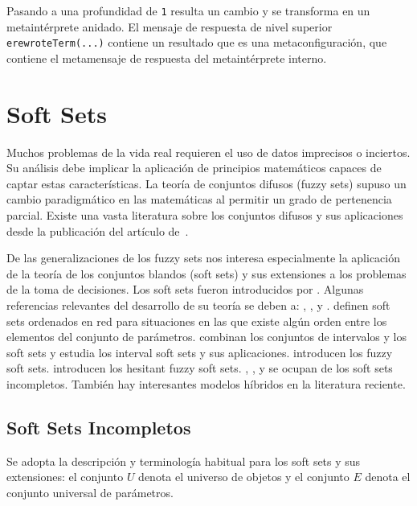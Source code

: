 Pasando a una profundidad de \texttt{1} resulta un cambio y se transforma en un metaintérprete anidado.
El mensaje de respuesta de nivel superior \texttt{erewroteTerm(...)} contiene un resultado que es una metaconfiguración, que contiene el metamensaje de respuesta del metaintérprete interno.



\newpage
\section{Soft Sets}\label{SS}
Muchos problemas de la vida real requieren el uso de datos imprecisos o inciertos. Su análisis debe implicar la aplicación de principios matemáticos capaces de captar estas características. La teoría de conjuntos difusos (fuzzy sets) supuso un cambio paradigmático en las matemáticas al permitir un grado de pertenencia parcial. Existe una vasta literatura sobre los conjuntos difusos y sus aplicaciones desde la publicación del artículo de~\citet{Zadeh}. 

De las generalizaciones de los fuzzy sets nos interesa especialmente la aplicación de la teoría de los conjuntos blandos (soft sets) y sus extensiones a los problemas de la toma de decisiones.
Los soft sets fueron introducidos por \citep{Molodtsov99}. 
Algunas referencias relevantes del desarrollo de su teoría se deben a: \citet{AktasCagman}, \citet{alcantud2016novel,Alcantud2016IJAR}, \citet{AliFengLiuMinShabir} y \citet{MajiBR03}.
\citet{AliMahmood} definen soft sets ordenados en red para situaciones en las que existe algún orden entre los elementos del conjunto de parámetros. \citet{QinMengPeiXu} combinan los conjuntos de intervalos y los soft sets y \citet{Zhang} estudia los interval soft sets y sus aplicaciones. \citet{MajiBR01} introducen los fuzzy soft sets. \citet{WangLiChen} introducen los hesitant fuzzy soft sets. \citet{Hanetal}, \citet{QinMaHerawanZain}, y \citet{ZouXiao} se ocupan de los soft sets incompletos. También hay interesantes modelos híbridos en la literatura reciente.


\subsection{Soft Sets Incompletos}

Se adopta la descripción y terminología habitual para los soft sets y sus extensiones: el conjunto $U$ denota el universo de objetos y el conjunto $E$ denota el conjunto universal de parámetros.

